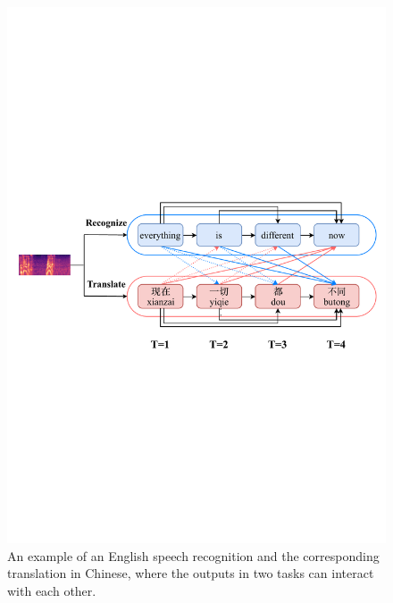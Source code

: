 \documentclass[letterpaper]{article} %
\begin{document}
\begin{figure}[t]
	\centering
	\includegraphics[width=\columnwidth]{example.pdf}
	\caption{An example of an English speech recognition and the corresponding translation in Chinese, where the outputs in two tasks can interact with each other.}
	\label{fig:example}
\end{figure}
\end{document}
